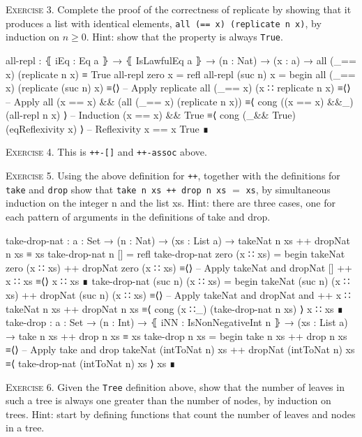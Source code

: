\documentclass{article}
\begin{document}
\noindent
\textsc{Exercise 3.}
Complete the proof of the correctness of replicate by showing that it produces a list with identical elements, \verb!all (== x) (replicate n x)!, by induction on $n ≥ 0$. Hint: show that the property is always \verb!True!.

\begin{code}
all-repl : ⦃ iEq : Eq a ⦄ → ⦃ IsLawfulEq a ⦄ → (n : Nat) → (x : a)
    → all (_== x) (replicate n x) ≡ True
all-repl zero x = refl
all-repl (suc n) x =
  begin
    all (_== x) (replicate (suc n) x)
  ≡⟨⟩ -- Apply replicate
    all (_== x) (x ∷ replicate n x)
  ≡⟨⟩ -- Apply all
    (x == x) && (all (_== x) (replicate n x))
  ≡⟨ cong ((x == x) &&_) (all-repl n x) ⟩ -- Induction
    (x == x) && True
  ≡⟨ cong (_&& True) (eqReflexivity x) ⟩ -- Reflexivity x == x
    True
  ∎
\end{code}

\noindent
\textsc{Exercise 4.} This is \verb!++-[]! and \verb!++-assoc! above.
\vspace{3pt}

\noindent
\textsc{Exercise 5.} Using the above definition for \texttt{++}, together with the definitions for \texttt{take} and \texttt{drop} show that \verb!take n xs ++ drop n xs! $=$ \verb!xs!, by simultaneous induction on the integer n and the list xs. Hint: there are three cases, one for each pattern of arguments in the definitions of take and drop.

\begin{code}
take-drop-nat : {a : Set} → (n : Nat) → (xs : List a)
    → takeNat n xs ++ dropNat n xs ≡ xs
take-drop-nat n [] = refl
take-drop-nat zero (x ∷ xs) =
  begin
    takeNat zero (x ∷ xs) ++ dropNat zero (x ∷ xs)
  ≡⟨⟩ -- Apply takeNat and dropNat
    [] ++ x ∷ xs
  ≡⟨⟩
    x ∷ xs
  ∎
take-drop-nat (suc n) (x ∷ xs) =
  begin
    takeNat (suc n) (x ∷ xs) ++ dropNat (suc n) (x ∷ xs)
  ≡⟨⟩ -- Apply takeNat and dropNat and ++
    x ∷ takeNat n xs ++ dropNat n xs
  ≡⟨ cong (x ∷_) (take-drop-nat n xs) ⟩
    x ∷ xs
  ∎
take-drop : {a : Set} → (n : Int) → ⦃ iNN : IsNonNegativeInt n ⦄
    → (xs : List a) → take n xs ++ drop n xs ≡ xs
take-drop n xs =
  begin
    take n xs ++ drop n xs
  ≡⟨⟩ -- Apply take and drop
    takeNat (intToNat n) xs ++ dropNat (intToNat n) xs
  ≡⟨ take-drop-nat (intToNat n) xs ⟩
    xs
  ∎
\end{code}

\noindent
\textsc{Exercise 6.} Given the \texttt{Tree} definition above, show that the number of leaves in such a tree is always one greater than the number of nodes, by induction on trees. Hint: start by defining functions that count the number of leaves and nodes in a tree.
\end{document}
